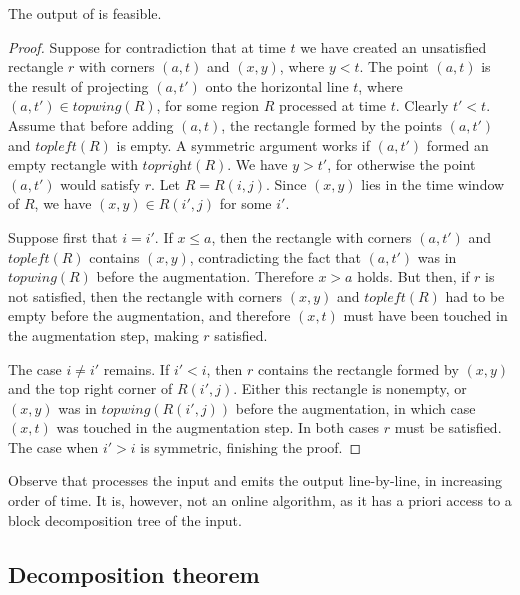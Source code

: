 \begin{lemma}
\label{lem:feasibility}
The output of \agreedy is feasible.  
\end{lemma}  
\begin{proof} 



Suppose for contradiction that at time $t$ we have created an unsatisfied rectangle $r$ with corners $(a,t)$ and $(x,y)$, where $y<t$. The point $(a,t)$ is the result of projecting $(a,t')$ onto the horizontal line $t$, where $(a,t') \in \textit{topwing}(R)$, for some region $R$ processed at time $t$. Clearly $t'<t$. Assume that before adding $(a,t)$, the rectangle formed by the points $(a,t')$ and $\textit{topleft}(R)$ is empty. A symmetric argument works if $(a,t')$ formed an empty rectangle with $\textit{topright}(R)$. We have $y > t'$, for otherwise the point $(a,t')$ would satisfy $r$. Let $R = R(i,j)$. Since $(x,y)$ lies in the time window of $R$, we have $(x,y) \in R(i',j)$ for some $i'$.


Suppose first that $i = i'$. 
If $x \leq a$, then the rectangle with corners $(a,t')$ and $\textit{topleft}(R)$ contains $(x,y)$, contradicting the fact that $(a,t')$ was in $\textit{topwing}(R)$ before the augmentation. Therefore $x>a$ holds. But then, if $r$ is not satisfied, then the rectangle with corners $(x,y)$ and $\textit{topleft}(R)$ had to be empty before the augmentation, and therefore $(x,t)$ must have been touched in the augmentation step, making $r$ satisfied. 

The case $i \not= i'$ remains. If $i'<i$, then $r$ contains the rectangle formed by $(x,y)$ and the top right corner of $R(i',j)$. Either this rectangle is nonempty, or $(x,y)$ was in $\textit{topwing}(R(i',j))$ before the augmentation, in which case $(x,t)$ was touched in the augmentation step. In both cases $r$ must be satisfied. The case when $i'>i$ is symmetric, finishing the proof.

\end{proof} 


Observe that \agreedy processes the input and emits the output line-by-line, in increasing order of time. It is, however, not an online algorithm, as it has a priori access to a block decomposition tree of the input.

\subsection{Decomposition theorem }



